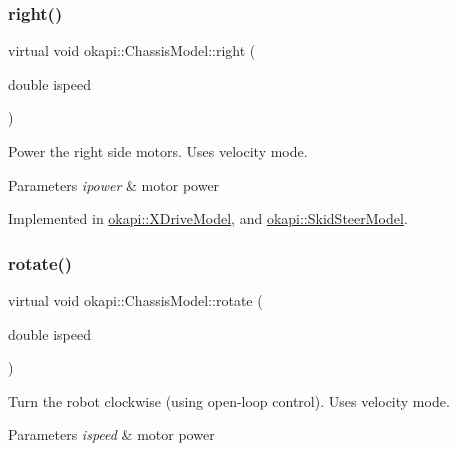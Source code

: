 \mbox{\label{classokapi_1_1ChassisModel_a282fcf947aea9630cadd2c673eb5f7e3}} 
\subsubsection{\texorpdfstring{right()}{right()}}
{\footnotesize\ttfamily virtual void okapi\+::\+Chassis\+Model\+::right (\begin{DoxyParamCaption}\item[{double}]{ispeed }\end{DoxyParamCaption})\hspace{0.3cm}{\ttfamily [pure virtual]}}

Power the right side motors. Uses velocity mode.


\begin{DoxyParams}{Parameters}
{\em ipower} & motor power \\
\hline
\end{DoxyParams}


Implemented in \mbox{\hyperlink{classokapi_1_1XDriveModel_a21bc8f93cda3b0b58ec6543a6dc02c24}{okapi\+::\+X\+Drive\+Model}}, and \mbox{\hyperlink{classokapi_1_1SkidSteerModel_ada9bd222b5aeaa0507b57906ac59dd3b}{okapi\+::\+Skid\+Steer\+Model}}.

\mbox{\label{classokapi_1_1ChassisModel_af13aa5281c762eb61a444f0b35176014}} 
\subsubsection{\texorpdfstring{rotate()}{rotate()}}
{\footnotesize\ttfamily virtual void okapi\+::\+Chassis\+Model\+::rotate (\begin{DoxyParamCaption}\item[{double}]{ispeed }\end{DoxyParamCaption})\hspace{0.3cm}{\ttfamily [pure virtual]}}

Turn the robot clockwise (using open-\/loop control). Uses velocity mode.


\begin{DoxyParams}{Parameters}
{\em ispeed} & motor power \\
\hline
\end{DoxyParams}


